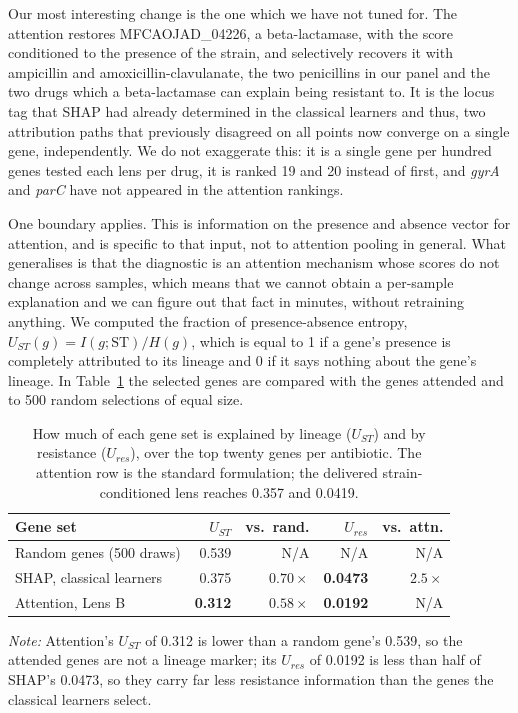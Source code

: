 \documentclass[journal]{IEEEtran}
\begin{document}
Our most interesting change is the one which we have not tuned for. The attention
restores MFCAOJAD\_04226, a beta-lactamase, with the score conditioned to the presence
of the strain, and selectively recovers it with ampicillin and
amoxicillin-clavulanate, the two penicillins in our panel and the two drugs which a
beta-lactamase can explain being resistant to. It is the locus tag that SHAP had
already determined in the classical learners and thus, two attribution paths that
previously disagreed on all points now converge on a single gene, independently. We do
not exaggerate this: it is a single gene per hundred genes tested each lens per drug,
it is ranked 19 and 20 instead of first, and \textit{gyrA} and \textit{parC} have not
appeared in the attention rankings.

One boundary applies. This is information on the presence and absence vector for
attention, and is specific to that input, not to attention pooling in general. What
generalises is that the diagnostic is an attention mechanism whose scores do not change
across samples, which means that we cannot obtain a per-sample explanation and we can
figure out that fact in minutes, without retraining anything. We computed the fraction
of presence-absence entropy, $U_{ST}(g) = I(g;\mathrm{ST})/H(g)$, which is equal to 1
if a gene's presence is completely attributed to its lineage and 0 if it says nothing
about the gene's lineage. In Table~\ref{tab:umark} the selected genes are compared with
the genes attended and to 500 random selections of equal size.

\begin{table}[!tb]
\caption{How much of each gene set is explained by lineage ($U_{ST}$) and by
resistance ($U_{res}$), over the top twenty genes per antibiotic. The attention row is
the standard formulation; the delivered strain-conditioned lens reaches 0.357 and
0.0419.}
\label{tab:umark}
\centering
\small
\setlength{\tabcolsep}{4pt}
\renewcommand{\arraystretch}{1.05}
\begin{tabular}{|>{\raggedright\arraybackslash}p{2.6cm}|r|r|r|r|}
\hline
\rowcolor{headgrey}
\textbf{Gene set} & \textbf{$U_{ST}$} & \textbf{vs.\ rand.} & \textbf{$U_{res}$} & \textbf{vs.\ attn.} \\ \hline
Random genes (500 draws) & 0.539 & N/A & N/A & N/A \\ \hline
SHAP, classical learners & 0.375 & $0.70\times$ & \textbf{0.0473} & $2.5\times$ \\ \hline
Attention, Lens B & \textbf{0.312} & $0.58\times$ & \textbf{0.0192} & N/A \\ \hline
\end{tabular}
\renewcommand{\arraystretch}{1.0}
\vspace{0.4em}

\noindent\footnotesize\textit{Note:} Attention's $U_{ST}$ of 0.312 is lower than a random gene's
0.539, so the attended genes are not a lineage marker; its $U_{res}$ of 0.0192 is less than half
of SHAP's 0.0473, so they carry far less resistance information than the genes the classical
learners select.
\end{table}
\end{document}
